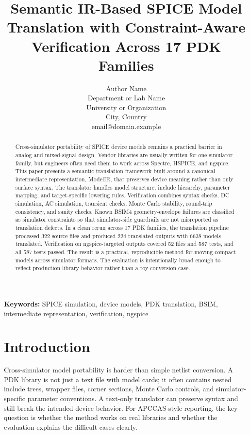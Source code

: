 \documentclass[10pt,twocolumn]{article}
\begin{document}
\title{Semantic IR-Based SPICE Model Translation with Constraint-Aware Verification Across 17 PDK Families}

\author{Author Name\\Department or Lab Name\\University or Organization\\City, Country\\email@domain.example}
\date{}

\maketitle

\begin{abstract}
Cross-simulator portability of SPICE device models remains a practical barrier in analog and mixed-signal design. Vendor libraries are usually written for one simulator family, but engineers often need them to work across Spectre, HSPICE, and ngspice. This paper presents a semantic translation framework built around a canonical intermediate representation, ModelIR, that preserves device meaning rather than only surface syntax. The translator handles model structure, include hierarchy, parameter mapping, and target-specific lowering rules. Verification combines syntax checks, DC simulation, AC simulation, transient checks, Monte Carlo stability, round-trip consistency, and sanity checks. Known BSIM4 geometry-envelope failures are classified as simulator constraints so that simulator-side guardrails are not misreported as translation defects. In a clean rerun across 17 PDK families, the translation pipeline processed 322 source files and produced 224 translated outputs with 6638 models translated. Verification on ngspice-targeted outputs covered 52 files and 587 tests, and all 587 tests passed. The result is a practical, reproducible method for moving compact models across simulator formats. The evaluation is intentionally broad enough to reflect production library behavior rather than a toy conversion case.
\end{abstract}

\textbf{Keywords:} SPICE simulation, device models, PDK translation, BSIM, intermediate representation, verification, ngspice

\section{Introduction}
Cross-simulator model portability is harder than simple netlist conversion. A PDK library is not just a text file with model cards; it often contains nested include trees, wrapper files, corner sections, Monte Carlo controls, and simulator-specific parameter conventions. A text-only translator can preserve syntax and still break the intended device behavior. For APCCAS-style reporting, the key question is whether the method works on real libraries and whether the evaluation explains the difficult cases clearly.
\end{document}
